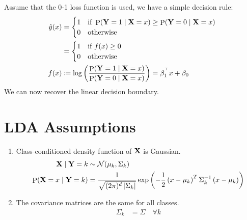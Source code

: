 \documentclass[letterpaper,12pt]{article}
\theoremstyle{plain}
\theoremstyle{definition}
\theoremstyle{remark}
\def\P{\mathop{\mathrm{P}}}
\begin{document}
Assume that the 0-1 loss function is used, we have a simple decision rule:
\begin{align}
    \hat{y}(x) & = \begin{cases}
                       1 & \text{if } \P(\rmY = 1 \mid \rmX = x) \geq \P(\rmY = 0 \mid \rmX = x) \\
                       0 & \text{otherwise}
                   \end{cases}                                         \\
               & = \begin{cases}
                       1 & \text{if } f(x) \ge 0 \\
                       0 & \text{otherwise}
                   \end{cases}                                                                                         \\
    f(x)       & \coloneqq \log \left(\frac{\P(\rmY = 1 \mid \rmX = x)}{\P(\rmY = 0 \mid \rmX = x)}\right)  = \beta_1^\T x + \beta_0
\end{align}
We can now recover the linear decision boundary.

\section{LDA Assumptions}

\begin{enumerate}[leftmargin=*]
    \item Class-conditioned density function of ${\mathbf{X}}$ is Gaussian.
          \begin{align}
              \rmX \mid \rmY = k         & \sim \mathcal{N}(\mu_k, \Sigma_k)                                                                                                                      \\
              \P(\rmX = x \mid \rmY = k) & = \frac{1}{\sqrt{(2\pi)^d \left| \Sigma_k \right|}} \exp \left( -\frac{1}{2} \left( x - \mu_k \right)^T \Sigma_k^{-1} \left( x - \mu_k \right) \right)
          \end{align}
    \item The covariance matrices are the same for all classes.
          \begin{align}
              \Sigma_k & = \Sigma \quad \forall k
          \end{align}
\end{enumerate}
\end{document}
